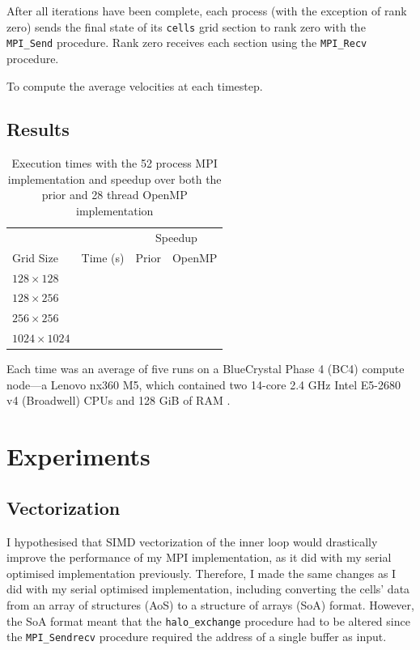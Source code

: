 \documentclass[twocolumn, a4paper]{article}
\begin{document}
After all iterations have been complete, each process (with the exception of rank zero) sends the final state of its \texttt{cells} grid section to rank zero with the \texttt{MPI\_Send} procedure.
Rank zero receives each section using the \texttt{MPI\_Recv} procedure.

To compute the average velocities at each timestep.

\subsection{Results}

\begin{table}[htbp]
  \begin{center}
  \caption{Execution times with the 52 process MPI implementation and speedup over both the prior and 28 thread OpenMP implementation}\label{tab:mpi}
  \begin{tabular}[t]{l | l  l  l} 
      \hline\hline
      &&\multicolumn{2}{c}{Speedup}\\
      \cline{3-4}
      Grid Size&Time (s)&Prior&OpenMP\\
      \hline
      $128 \times 128$&\texttt{}&\texttt{}&\texttt{}\\
      $128 \times 256$&\texttt{}&\texttt{}&\texttt{}\\
      $256 \times 256$&\texttt{}&\texttt{}&\texttt{}\\
      $1024 \times 1024$&\texttt{}&\texttt{}&\texttt{}\\
      \hline
    \end{tabular}
  \end{center}
\end{table}

Each time was an average of five runs on a BlueCrystal Phase 4 (BC4) compute node---a Lenovo nx360 M5, which contained two 14-core 2.4 GHz Intel E5-2680 v4 (Broadwell) CPUs and 128 GiB of RAM \cite{bcp4}.

\section{Experiments}

\subsection{Vectorization}

I hypothesised that SIMD vectorization of the inner loop would drastically improve the performance of my MPI implementation, as it did with my serial optimised implementation previously.
Therefore, I made the same changes as I did with my serial optimised implementation, including converting the cells' data from an array of structures (AoS) to a structure of arrays (SoA) format.
However, the SoA format meant that the \texttt{halo\_exchange} procedure had to be altered since the \texttt{MPI\_Sendrecv} procedure required the address of a single buffer as input.
\end{document}
